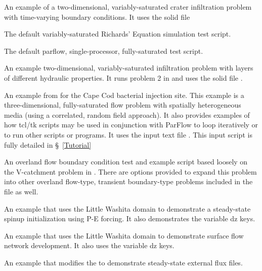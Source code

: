 \begin{description}

\item{ An example of a two-dimensional, variably-saturated crater infiltration problem with time-varying boundary conditions.  It uses the solid file }

\item{ The default variably-saturated Richards' Equation simulation test script.}

\item{ The default parflow, single-processor, fully-saturated test script.}

\item{ An example two-dimensional, variably-saturated infiltration problem with layers of different hydraulic properties. It runs problem 2 in \cite{FWP95} and uses the solid file .}

\item{ An example from \cite{MWH07} for the Cape Cod bacterial injection site.  This example is a three-dimensional, fully-saturated flow problem with spatially heterogeneous media (using a correlated, random field approach).  It also provides examples of how tcl/tk scripts may be used in conjunction with ParFlow to loop iteratively or to run other scripts or programs.  It uses the input text file . This input script is fully detailed in \S~\ref{Tutorial}}

\item{ An overland flow boundary condition test and example script based loosely on the V-catchment problem in \cite{KM06}.  There are options provided to expand this problem into other overland flow-type, transient boundary-type problems included in the file as well.}

\item{ An example that uses the Little Washita domain to demonstrate a steady-state spinup initialization using P-E forcing. It also demonstrates the variable dz keys.}

\item{ An example that uses the Little Washita domain to demonstrate surface flow network development.  It also uses the variable dz keys.}

\item{ An example that modifies the  to demonstrate steady-state external flux  files.}


\end{description}

